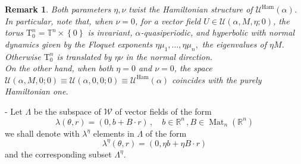 \documentclass[oneside, 11pt]{amsbook}
\newcommand{\set}[1]{{\left\{#1\right\}}}
\newcommand{\normal}{\mathrm}
\newcommand{\U}{\mathcal{U}}
\newcommand{\T}{\mathbb{T}}
\newcommand{\R}{\mathbb{R}}
\newcommand{\teta}{\theta}
\newcommand{\Mat}{\operatorname{Mat}}
\newcommand{\Uh}{\mathcal{U}^{\operatorname{Ham}}}
\def\U{{\mathcal U}}
\newcommand{\cU}{{\mathcal U}}
\newcommand{\cW}{{\mathcal W}}
\newcommand{\0}{{(0)}}
\newcommand{\3}{{(3)}}
\newtheorem{rmk}{Remark}[section]
\numberwithin{equation}{section}
\numberwithin{defn}{section}
\numberwithin{prop}{section}
\numberwithin{cor}{section}
\numberwithin{lemma}{section}
\numberwithin{rmk}{section}
\numberwithin{corollary}{section}
\begin{document}
\begin{rmk}
Both parameters $\eta,\nu$ twist the Hamiltonian structure of $\Uh(\alpha)$. In particular, note that, when $\nu = 0$,  for a vector field  $U\in \U(\alpha,M,\eta; 0)$, the torus $\normal{T}^n_0 = \T^n\times\set{0}$ is invariant, $\alpha$-quasiperiodic, and hyperbolic with normal dynamics given by the Floquet exponents $\eta \mu_1,\ldots,\eta \mu_n,$ the eigenvalues of $\eta M$. Otherwise $\normal{T}^n_0$ is translated by $\eta\nu$ in the normal direction. \\

On the other hand, when both $\eta=0$ and $\nu=0$, the space $\cU(\alpha,M, 0;0)\equiv\cU(\alpha,0,0;0) \equiv \Uh(\alpha)$ coincides with the purely Hamiltonian one.
\end{rmk}


- Let $\Lambda $ be the subspace of $\cW$ of vector fields of the form
\begin{equation}
	\lambda(\teta,r) = (0,  b +  B\cdot r)\,,\quad b\in\R^n\,, B\in\Mat_n(\R^n)
	\end{equation}
we shall denote with $\lambda^\eta$ elements in $\Lambda$ of the form 
$$
\lambda^\eta(\teta,r) = (0,  \eta b + \eta B\cdot r)
$$ and the corresponding subset $\Lambda^\eta$.  \\
\end{document}
